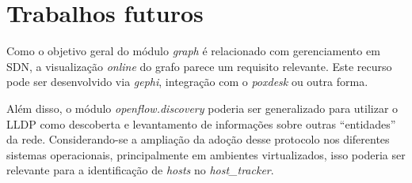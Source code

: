 \section{Trabalhos futuros}
\label{sec:future}

Como o objetivo geral do módulo \emph{graph} é relacionado com
gerenciamento em SDN, a visualização \emph{online} do grafo
parece um requisito relevante. 
Este recurso pode ser desenvolvido via \emph{gephi}, 
integração com o \emph{poxdesk} ou outra forma.

Além disso, o módulo \emph{openflow.discovery}
poderia ser generalizado para utilizar o LLDP como
descoberta e levantamento de informações sobre outras 
``entidades'' da rede.
Considerando-se a ampliação da adoção desse protocolo
nos diferentes sistemas operacionais, 
principalmente em ambientes virtualizados,
isso poderia ser relevante para a identificação de \emph{hosts}
no \emph{host\_tracker}.